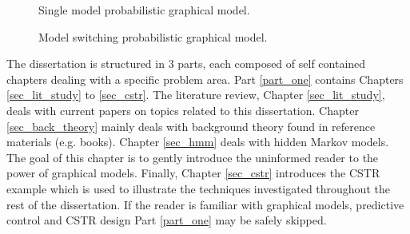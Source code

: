 \begin{figure}[H]
 \centering
\begin{minipage}[b]{0.45\textwidth}
 \centering
{}
\caption{Single model probabilistic graphical model.}
\label{fig_linear}
\end{minipage}\hfill
\begin{minipage}[b]{0.45\textwidth}
 \centering
{}
\caption{Model switching probabilistic graphical model.}
\label{fig_switch_linear}
\end{minipage}
\end{figure}
The dissertation is structured in 3 parts, each composed of self contained chapters dealing with a specific problem area. Part \ref{part_one} contains Chapters \ref{sec_lit_study} to \ref{sec_cstr}. The literature review, Chapter \ref{sec_lit_study}, deals with current papers on topics related to this dissertation. Chapter \ref{sec_back_theory} mainly deals with background theory found in reference materials (e.g. books). Chapter \ref{sec_hmm} deals with hidden Markov models. The goal of this chapter is to gently introduce the uninformed reader to the power of graphical models. Finally, Chapter \ref{sec_cstr} introduces the CSTR example which is used to illustrate the techniques investigated throughout the rest of the dissertation. If the reader is familiar with graphical models, predictive control and CSTR design Part \ref{part_one} may be safely skipped.

